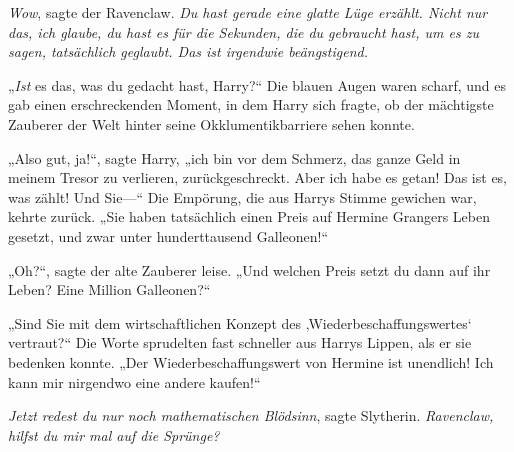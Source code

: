 \emph{Wow}, sagte der Ravenclaw. \emph{Du hast gerade eine glatte Lüge erzählt. Nicht nur das, ich glaube, du hast es für die Sekunden, die du gebraucht hast, um es zu sagen, tatsächlich geglaubt. Das ist irgendwie beängstigend.}

„\emph{Ist} es das, was du gedacht hast, Harry?“
Die blauen Augen waren scharf, und es gab einen erschreckenden Moment, in dem Harry sich fragte, ob der mächtigste Zauberer der Welt hinter seine Okklumentikbarriere sehen konnte.

„Also gut, ja!“, sagte Harry, „ich bin vor dem Schmerz, das ganze Geld in meinem Tresor zu verlieren, zurückgeschreckt. Aber ich habe es getan! Das ist es, was zählt! Und Sie—“
Die Empörung, die aus Harrys Stimme gewichen war, kehrte zurück.
„Sie haben tatsächlich einen Preis auf Hermine Grangers Leben gesetzt, und zwar unter hunderttausend Galleonen!“

„Oh?“, sagte der alte Zauberer leise. „Und welchen Preis setzt du dann auf ihr Leben? Eine Million Galleonen?“

„Sind Sie mit dem wirtschaftlichen Konzept des ‚Wiederbeschaffungswertes‘ vertraut?“ Die Worte sprudelten fast schneller aus Harrys Lippen, als er sie bedenken konnte. „Der Wiederbeschaffungswert von Hermine ist unendlich! Ich kann mir nirgendwo eine andere kaufen!“

\emph{Jetzt redest du nur noch mathematischen Blödsinn}, sagte Slytherin. \emph{Ravenclaw, hilfst du mir mal auf die Sprünge?}

